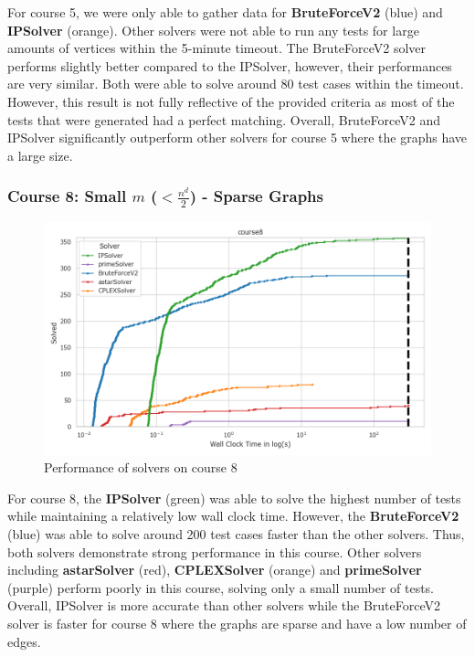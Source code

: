 For course 5, we were only able to gather data for \textbf{BruteForceV2} (blue) and \textbf{IPSolver} (orange). Other solvers were not able to run any tests for large amounts of vertices within the 5-minute timeout. The BruteForceV2 solver performs slightly better compared to the IPSolver, however, their performances are very similar. Both were able to solve around 80 test cases within the timeout. However, this result is not fully reflective of the provided criteria as most of the tests that were generated had a perfect matching.  Overall, BruteForceV2 and IPSolver significantly outperform other solvers for course 5 where the graphs have a large size.

\subsubsection*{Course 8: Small $m$ ($< \frac{n^d}{2}$) - Sparse Graphs}

\begin{figure}[h!]
    \centering
    \includegraphics[width=\textwidth]{Graphs/course8.png}
    \caption{Performance of solvers on course 8}
\end{figure}

For course 8, the \textbf{IPSolver} (green) was able to solve the highest number of tests while maintaining a relatively low wall clock time. However, the \textbf{BruteForceV2} (blue) was able to solve around 200 test cases faster than the other solvers. Thus, both solvers demonstrate strong performance in this course. Other solvers including \textbf{astarSolver} (red), \textbf{CPLEXSolver} (orange) and \textbf{primeSolver} (purple) perform poorly in this course, solving only a small number of tests. Overall, IPSolver is more accurate than other solvers while the BruteForceV2 solver is faster for course 8 where the graphs are sparse and have a low number of edges.

